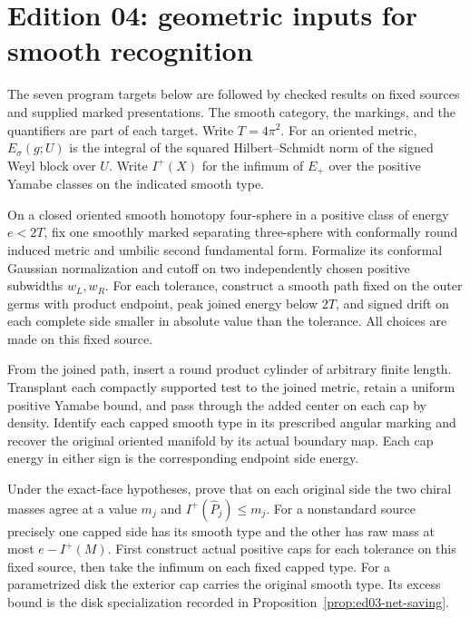\section{Edition 04: geometric inputs for smooth recognition}
\label{sec:ed04}
The seven program targets below are followed by checked results on fixed sources and supplied marked presentations.
The smooth category, the markings, and the quantifiers are part of each
target. Write $T=4\pi^2$. For an oriented metric, $E_\sigma(g;U)$
is the integral of the squared Hilbert--Schmidt norm of the signed Weyl
block over $U$. Write $I^+(X)$ for the infimum of $E_+$ over the
positive Yamabe classes on the indicated smooth type.

\begin{openproblem}
\label{ed04:exact-face}
On a closed oriented smooth homotopy four-sphere in a positive class
of energy $e<2T$, fix one smoothly marked separating three-sphere with
conformally round induced metric and umbilic second fundamental form.
Formalize its conformal Gaussian normalization and cutoff on two
independently chosen positive subwidths $w_L,w_R$. For each tolerance,
construct a smooth path fixed on the outer germs with product endpoint,
peak joined energy below $2T$, and signed drift on each complete side
smaller in absolute value than the tolerance. All choices are made on
this fixed source.
\end{openproblem}

\begin{openproblem}
\label{ed04:caps}
From the joined path, insert a round product cylinder of arbitrary
finite length. Transplant each compactly supported test to the joined
metric, retain a uniform positive Yamabe bound, and pass through the
added center on each cap by density. Identify each capped smooth type
in its prescribed angular marking and recover the original oriented
manifold by its actual boundary map. Each cap energy in either sign is
the corresponding endpoint side energy.
\end{openproblem}

\begin{openproblem}
\label{ed04:side-masses}
Under the exact-face hypotheses, prove that on each original side the
two chiral masses agree at a value $m_j$ and $I^+(\widehat P_j)\le m_j$.
For a nonstandard source precisely one capped side has its smooth type
and the other has raw mass at most $e-I^+(M)$. First construct actual
positive caps for each tolerance on this fixed source, then take the
infimum on each fixed capped type. For a parametrized disk the exterior
cap carries the original smooth type. Its excess bound is the disk
specialization recorded in Proposition~\ref{prop:ed03-net-saving}.
\end{openproblem}

